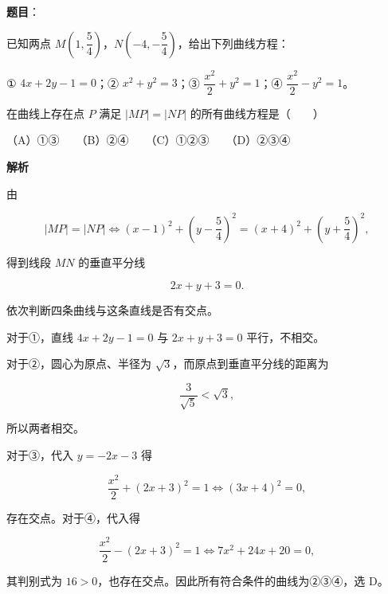\begin{answer}

\textbf{题目}：

已知两点 $M\left(1,\dfrac54\right)$，$N\left(-4,-\dfrac54\right)$，给出下列曲线方程：

① $4x+2y-1=0$；② $x^2+y^2=3$；③ $\dfrac{x^2}{2}+y^2=1$；④ $\dfrac{x^2}{2}-y^2=1$。

在曲线上存在点 $P$ 满足 $|MP|=|NP|$ 的所有曲线方程是\mbox{（　　）}

（A）①③　　（B）②④　　（C）①②③　　（D）②③④

\textbf{解析}

由

\nopagebreak[4]
\[
|MP|=|NP|
\Longleftrightarrow
(x-1)^2+\left(y-\frac54\right)^2
=(x+4)^2+\left(y+\frac54\right)^2,
\]

得到线段 $MN$ 的垂直平分线

\nopagebreak[4]
\[
2x+y+3=0.
\]

依次判断四条曲线与这条直线是否有交点。

对于①，直线 $4x+2y-1=0$ 与 $2x+y+3=0$ 平行，不相交。

对于②，圆心为原点、半径为 $\sqrt3$，而原点到垂直平分线的距离为

\nopagebreak[4]
\[
\frac3{\sqrt5}<\sqrt3,
\]

所以两者相交。

对于③，代入 $y=-2x-3$ 得

\nopagebreak[4]
\[
\frac{x^2}{2}+(2x+3)^2=1
\Longleftrightarrow
(3x+4)^2=0,
\]

存在交点。对于④，代入得

\nopagebreak[4]
\[
\frac{x^2}{2}-(2x+3)^2=1
\Longleftrightarrow
7x^2+24x+20=0,
\]

其判别式为 $16>0$，也存在交点。因此所有符合条件的曲线为②③④，选 D。


\end{answer}
